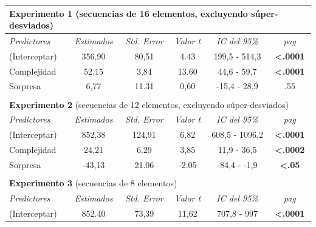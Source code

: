 \begin{table}[]
\centering
\begin{tabular}{lccccc}
\multicolumn{6}{l}{\textbf{Experimento 1} (secuencias de 16 elementos, excluyendo súper-desviados)}                          \\ \hline
\textit{Predictores}     & \textit{Estimados}  & \textit{Std. Error} & \textit{Valor t}   & \textit{IC del 95\%} & \textit{pag}       \\ \hline
(Interceptar)         & 356,90        & 80,51        & 4.43         & 199,5 - 514,3    & \textbf{\textless{}.0001} \\
Complejidad          & 52.15        & 3,84         & 13.60        & 44,6 - 59,7     & \textbf{\textless{}.0001} \\
Sorpresa           & 6,77         & 11.31        & 0,60         & -15,4 - 28,9     &.55            \\ \hline
\multicolumn{1}{c}{}     & \multicolumn{1}{l}{} &           &           &           &              \\
\multicolumn{6}{l}{\textbf{Experimento 2} (secuencias de 12 elementos, excluyendo súper-desviados)}                          \\ \hline
\textit{Predictores}     & \textit{Estimados}  & \textit{Std. Error} & \textit{Valor t}   & \textit{IC del 95\%} & \textit{pag}       \\ \hline
(Interceptar)         & 852,38        & 124,91        & 6,82         & 608,5 - 1096,2    & \textbf{\textless{}.0001} \\
Complejidad          & 24,21        & 6.29         & 3,85         & 11,9 - 36,5     & \textbf{\textless{}.0002} \\
Sorpresa           & -43,13        & 21.06        & -2.05        & -84,4 - -1,9     & \textbf{\textless{}.05}  \\ \hline
\textbf{}           & \multicolumn{1}{l}{} & \multicolumn{1}{l}{} & \multicolumn{1}{l}{} & \multicolumn{1}{l}{} & \multicolumn{1}{l}{}   \\
\multicolumn{6}{l}{\textbf{Experimento 3} (secuencias de 8 elementos)}                                        \\ \hline
\textit{Predictores}     & \textit{Estimados}  & \textit{Std. Error} & \textit{Valor t}   & \textit{IC del 95\%} & \textit{pag}       \\ \hline
(Interceptar)         & 852.40        & 73,39        & 11,62        & 707,8 - 997     & \textbf{\textless{}.0001} \\

\end{tabular}
\end{table}
